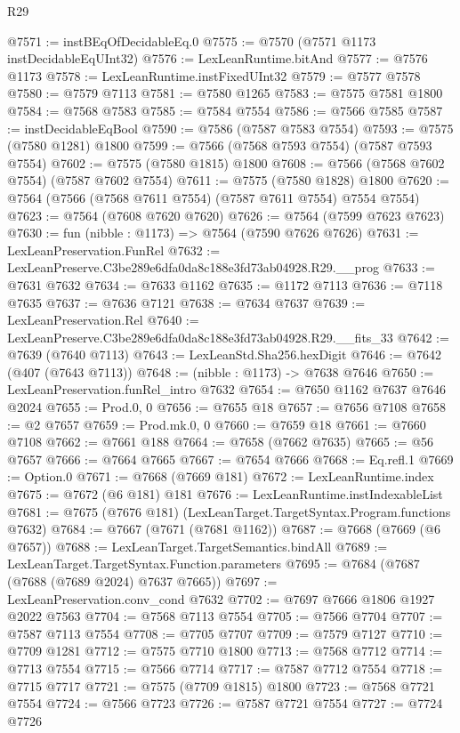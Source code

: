 \begin{lexlean}{R29}
\begin{coremodule}
@7571 := instBEqOfDecidableEq.{0}
@7575 := @7570 (@7571 @1173 instDecidableEqUInt32)
@7576 := LexLeanRuntime.bitAnd
@7577 := @7576 @1173
@7578 := LexLeanRuntime.instFixedUInt32
@7579 := @7577 @7578
@7580 := @7579 @7113
@7581 := @7580 @1265
@7583 := @7575 @7581 @1800
@7584 := @7568 @7583
@7585 := @7584 @7554
@7586 := @7566 @7585
@7587 := instDecidableEqBool
@7590 := @7586 (@7587 @7583 @7554)
@7593 := @7575 (@7580 @1281) @1800
@7599 := @7566 (@7568 @7593 @7554) (@7587 @7593 @7554)
@7602 := @7575 (@7580 @1815) @1800
@7608 := @7566 (@7568 @7602 @7554) (@7587 @7602 @7554)
@7611 := @7575 (@7580 @1828) @1800
@7620 := @7564 (@7566 (@7568 @7611 @7554) (@7587 @7611 @7554) @7554 @7554)
@7623 := @7564 (@7608 @7620 @7620)
@7626 := @7564 (@7599 @7623 @7623)
@7630 := fun (nibble : @1173) => @7564 (@7590 @7626 @7626)
@7631 := LexLeanPreservation.FunRel
@7632 := LexLeanPreserve.C3be289e6dfa0da8c188e3fd73ab04928.R29.__prog
@7633 := @7631 @7632
@7634 := @7633 @1162
@7635 := @1172 @7113
@7636 := @7118 @7635
@7637 := @7636 @7121
@7638 := @7634 @7637
@7639 := LexLeanPreservation.Rel
@7640 := LexLeanPreserve.C3be289e6dfa0da8c188e3fd73ab04928.R29.__fits_33
@7642 := @7639 (@7640 @7113)
@7643 := LexLeanStd.Sha256.hexDigit
@7646 := @7642 (@407 (@7643 @7113))
@7648 := (nibble : @1173) -> @7638 @7646
@7650 := LexLeanPreservation.funRel_intro @7632
@7654 := @7650 @1162 @7637 @7646 @2024
@7655 := Prod.{0, 0}
@7656 := @7655 @18
@7657 := @7656 @7108
@7658 := @2 @7657
@7659 := Prod.mk.{0, 0}
@7660 := @7659 @18
@7661 := @7660 @7108
@7662 := @7661 @188
@7664 := @7658 (@7662 @7635)
@7665 := @56 @7657
@7666 := @7664 @7665
@7667 := @7654 @7666
@7668 := Eq.refl.{1}
@7669 := Option.{0}
@7671 := @7668 (@7669 @181)
@7672 := LexLeanRuntime.index
@7675 := @7672 (@6 @181) @181
@7676 := LexLeanRuntime.instIndexableList
@7681 := @7675 (@7676 @181) (LexLeanTarget.TargetSyntax.Program.functions @7632)
@7684 := @7667 (@7671 (@7681 @1162))
@7687 := @7668 (@7669 (@6 @7657))
@7688 := LexLeanTarget.TargetSemantics.bindAll
@7689 := LexLeanTarget.TargetSyntax.Function.parameters
@7695 := @7684 (@7687 (@7688 (@7689 @2024) @7637 @7665))
@7697 := LexLeanPreservation.conv_cond @7632
@7702 := @7697 @7666 @1806 @1927 @2022 @7563
@7704 := @7568 @7113 @7554
@7705 := @7566 @7704
@7707 := @7587 @7113 @7554
@7708 := @7705 @7707
@7709 := @7579 @7127
@7710 := @7709 @1281
@7712 := @7575 @7710 @1800
@7713 := @7568 @7712
@7714 := @7713 @7554
@7715 := @7566 @7714
@7717 := @7587 @7712 @7554
@7718 := @7715 @7717
@7721 := @7575 (@7709 @1815) @1800
@7723 := @7568 @7721 @7554
@7724 := @7566 @7723
@7726 := @7587 @7721 @7554
@7727 := @7724 @7726

\end{coremodule}
\end{lexlean}

